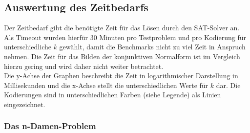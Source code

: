 \documentclass[a4,abstract=on]{scrartcl}
\begin{document}
\subsection{Auswertung des Zeitbedarfs}

Der Zeitbedarf gibt die benötigte Zeit für das Lösen durch den SAT-Solver an. Als Timeout wurden hierfür 30 Minuten pro Testproblem und pro Kodierung für unterschiedliche $k$ gewählt, damit die Benchmarks nicht zu viel Zeit in Anspruch nehmen. Die Zeit für das Bilden der konjunktiven Normalform ist im Vergleich hierzu gering und wird daher nicht weiter betrachtet.\\
Die y-Achse der Graphen beschreibt die Zeit in logarithmischer Darstellung in Millisekunden und die x-Achse stellt die unterschiedlichen Werte für $k$ dar. Die Kodierungen sind in unterschiedlichen Farben (siehe Legende) als Linien eingezeichnet.

\subsubsection*{Das n-Damen-Problem}

\end{document}
